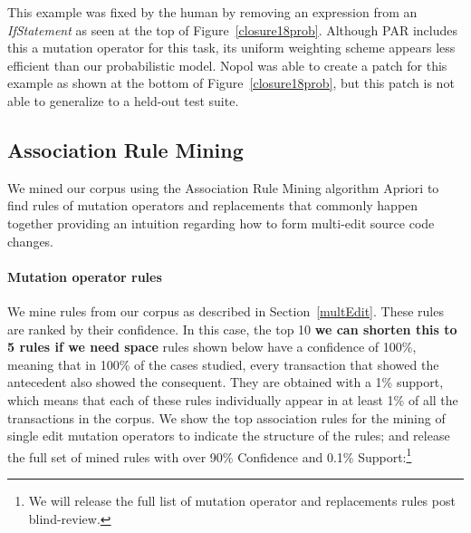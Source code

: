\documentclass[conference]{IEEEtran}
\newcommand{\todo}[1]
  {{\scriptsize \textbf{\color{red} {#1}}}}
\begin{document}
This example was fixed by the human by removing an expression from an
\emph{IfStatement} as seen at the top of Figure~\ref{closure18prob}. 
Although PAR includes this a mutation operator for this task, its uniform
weighting scheme appears less efficient than our probabilistic model. Nopol was
able to create a patch for this example as shown at the bottom of 
Figure~\ref{closure18prob}, but this patch is not able to generalize to a
held-out test suite.

\subsection{Association Rule Mining} \label{armRes}

We mined our corpus using the Association Rule Mining algorithm Apriori 
to find rules of mutation operators and 
replacements that commonly happen together providing an intuition regarding
how to form multi-edit
source code changes.

\paragraph{Mutation operator rules}
We mine rules from our corpus as described in Section~\ref{multEdit}.  
These rules are ranked by their confidence. In this case, the top 10 \todo{we can shorten this to 5 rules if we need space} rules shown
below have a confidence of 100\%, meaning that in 100\% of the cases
studied, every transaction that showed the antecedent also showed the consequent.
They are obtained with a 1\% support, which means that each of these rules
individually appear in at least 1\% of all the transactions in the
corpus. We show the top association rules for the mining of single edit 
mutation operators to indicate the structure of the rules; and release the full set of mined
rules with over 90\% Confidence and 0.1\% Support:\footnote{We will release the full list of mutation operator and replacements rules post blind-review.} %

\end{document}
